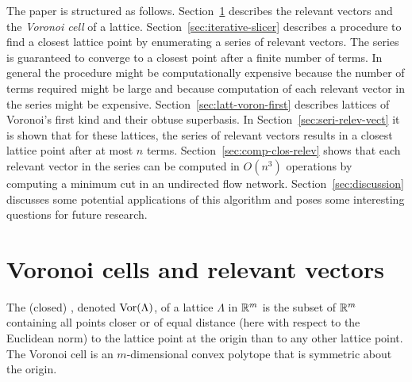 \documentclass[final,leqno]{siamltex}
\begin{document}
The paper is structured as follows.  Section~\ref{sec:voron-cells-relev} describes the relevant vectors and the \emph{Voronoi cell} of a lattice. Section~\ref{sec:iterative-slicer} describes a procedure to find a closest lattice point by enumerating a series of relevant vectors.  The series is guaranteed to converge to a closest point after a finite number of terms.  In general the procedure might be computationally expensive because the number of terms required might be large and because computation of each relevant vector in the series might be expensive.  Section~\ref{sec:latt-voron-first} describes lattices of Voronoi's first kind and their obtuse superbasis.  In Section~\ref{sec:seri-relev-vect} it is shown that for these lattices, the series of relevant vectors results in a closest lattice point after at most $n$ terms.  Section~\ref{sec:comp-clos-relev} shows that each relevant vector in the series can be computed in $O(n^3)$ operations by computing a minimum cut in an undirected flow network.  Section~\ref{sec:discussion} discusses some potential applications of this algorithm and poses some interesting questions for future research.

\section{Voronoi cells and relevant vectors}\label{sec:voron-cells-relev}
\newcommand{\calR}{\mathcal{R}}
The (closed) , denoted $\operatorname{Vor}(\Lambda)$, of a lattice $\Lambda$ in ${\mathbb R}^m$ is the subset of ${\mathbb R}^m$ containing all points closer or of equal distance (here with respect to the Euclidean norm) to the lattice point at the origin than to any other lattice point. The Voronoi cell is an $m$-dimensional convex polytope that is symmetric about the origin. %
 
\end{document}
